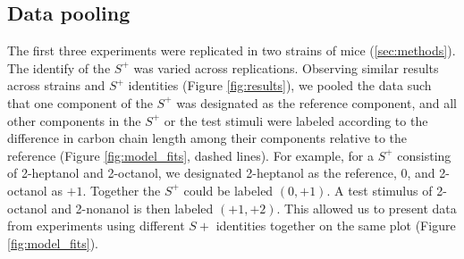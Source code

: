 \subsection*{Data pooling}
\label{results_pooling}
The first three experiments were replicated in two strains of mice (\ref{sec:methods}). 
The identify of the $S^+$ was varied across replications.  
Observing similar results across strains and $S^+$ identities (Figure \ref{fig:results}), we pooled the data such that one component of the $S^+$ was designated as the reference component, and all other components in the $S^+$ or the test stimuli were labeled according to the difference in carbon chain length among their components relative to the reference (Figure \ref{fig:model_fits}, dashed lines).  
For example, for a $S^+$ consisting of 2-heptanol and 2-octanol, we designated 2-heptanol as the reference, $0$, and 2-octanol as $+1$.  
Together the $S^+$ could be labeled $(0,+1)$.  
A test stimulus of 2-octanol and 2-nonanol is then labeled $(+1,+2)$.  
This allowed us to present data from experiments using different $S+$ identities together on the same plot (Figure \ref{fig:model_fits}).  